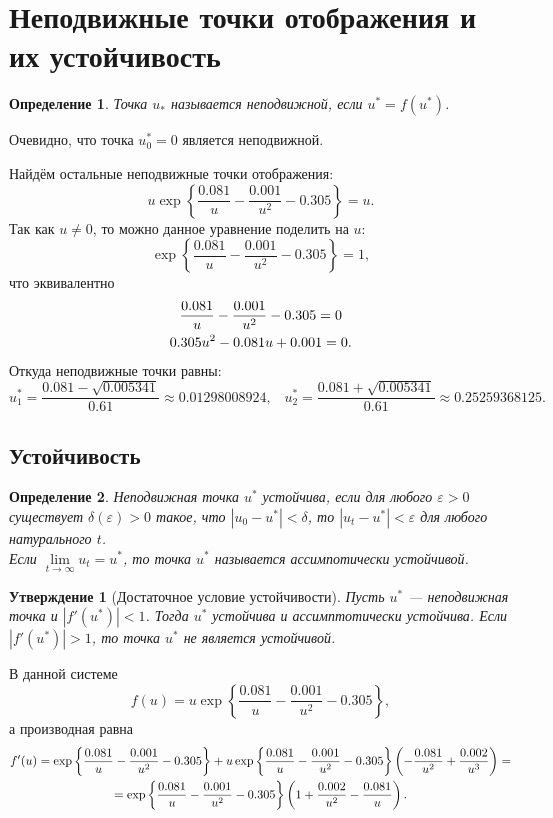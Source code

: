 \documentclass[11pt]{article}
\newtheorem{definition}{Определение}
\newtheorem{proposition}{Утверждение}
\newcommand\abs[1]{\left\lvert#1\right\rvert}
\begin{document}
\section{Неподвижные точки отображения и их устойчивость}
\begin{definition}
Точка $u_*$ называется неподвижной, если $u^* = f(u^*)$.
\end{definition}
Очевидно, что точка $u_0^* = 0$ является неподвижной.

Найдём остальные неподвижные точки отображения:
$$
u \exp\left\{\frac{0.081}{u} - \frac{0.001}{u^2} - 0.305\right\} = u.
$$
Так как $u \neq 0$, то можно данное уравнение поделить на $u$:
$$
\exp\left\{\frac{0.081}{u} - \frac{0.001}{u^2} - 0.305\right\} = 1,
$$
что эквивалентно
\begin{gather}
\frac{0.081}{u} - \frac{0.001}{u^2} - 0.305 = 0 \notag \\
0.305 u^2 - 0.081 u + 0.001 = 0. \notag
\end{gather}
Откуда неподвижные точки равны:
$$
u_1^* = \frac{0.081 - \sqrt{0.005341}}{0.61} \approx 0.01298008924, \; \; \; u_2^* = \frac{0.081 + \sqrt{0.005341}}{0.61} \approx 0.25259368125.
$$
\subsection{Устойчивость}
\begin{definition}
Неподвижная точка $u^*$ устойчива, если для любого $\varepsilon > 0$ существует $\delta(\varepsilon) > 0$ такое, что $\abs{u_0 - u^*} < \delta$, то $\abs{u_t - u^*} < \varepsilon$ для любого натурального $t$.\\
Если $\lim\limits_{t \to \infty} u_t = u^*$, то точка $u^*$ называется ассимпотически устойчивой.
\end{definition}
\begin{proposition}[Достаточное условие устойчивости]
Пусть $u^*$ --- неподвижная точка и $\abs{f'\left(u^*\right)} < 1$. Тогда $u^*$ устойчива и ассимптотически устойчива. Если $\abs{f'\left(u^*\right)} > 1$, то точка $u^*$ не является устойчивой.
\end{proposition}
В данной системе
$$
f(u) = u \exp\left\{ \frac{0.081}{u} - \frac{0.001}{u^2} - 0.305 \right\},
$$
а производная равна
\begin{gather}
f'(u) = \exp\left\{ \frac{0.081}{u} - \frac{0.001}{u^2} - 0.305 \right\} + u \exp\left\{ \frac{0.081}{u} - \frac{0.001}{u^2} - 0.305 \right\} \left( -\frac{0.081}{u^2} + \frac{0.002}{u^3} \right) = \notag \\
= \exp\left\{ \frac{0.081}{u} - \frac{0.001}{u^2} - 0.305 \right\} \left( 1 + \frac{0.002}{u^2} - \frac{0.081}{u} \right). \notag
\end{gather}
\end{document}

